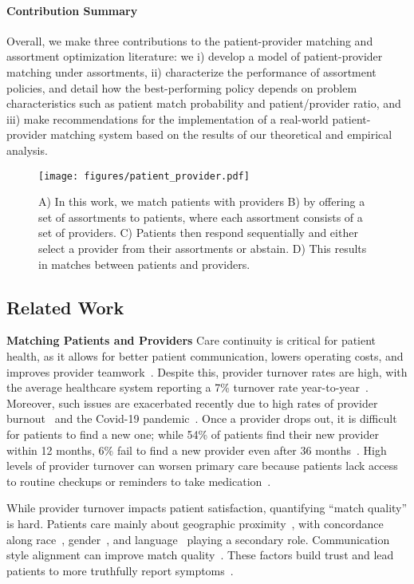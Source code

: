 \paragraph{Contribution Summary}
Overall, we make three contributions to the patient-provider matching and assortment optimization literature: we i) develop a model of patient-provider matching under assortments, ii) characterize the performance of assortment policies, and detail how the best-performing policy depends on problem characteristics such as patient match probability and patient/provider ratio, and iii) make recommendations for the implementation of a real-world patient-provider matching system based on the results of our theoretical and empirical analysis.  
\begin{figure*}
    \centering 
    \texttt{[image: figures/patient\_provider.pdf]}
    \caption{A) In this work, we match patients with providers B) by offering a set of assortments to patients, where each assortment consists of a set of providers. C) Patients then respond sequentially and either select a provider from their assortments or abstain. D) This results in matches between patients and providers.}
    \label{fig:pull}
\end{figure*}

\subsection{Related Work}
\textbf{Matching Patients and Providers} 
Care continuity is critical for patient health, as it allows for better patient communication, lowers operating costs, and improves provider teamwork~\citep{lower_turnover}. 
Despite this, provider turnover rates are high, with the average healthcare system reporting a 7\% turnover rate year-to-year~\citep{lower_turnover}. 
Moreover, such issues are exacerbated recently due to high rates of provider burnout~\citep{provider_burnout} and the Covid-19 pandemic~\citep{provider_burnout_covid19}. 
Once a provider drops out, it is difficult for patients to find a new one; while 54\% of patients find their new provider within 12 months, 6\% fail to find a new provider even after 36 months~\citep{finding_new_provider}. 
High levels of provider turnover can worsen primary care because patients lack access to routine checkups or reminders to take medication~\citep{pcp_turnover,importance_primary_care,race_concordance_adherence,concordance_race_cardio}. 

While provider turnover impacts patient satisfaction, quantifying ``match quality'' is hard. 
Patients care mainly about geographic proximity~\citep{patient_decisions}, with concordance along race~\citep{race_concordance}, gender~\citep{gender_concordance}, and language~\citep{language_concordance} playing a secondary role. 
Communication style alignment can improve match quality~\citep{personal_factor_concordance}. These factors build trust and lead patients to more truthfully report symptoms~\citep{race_concordance_lung}. 

